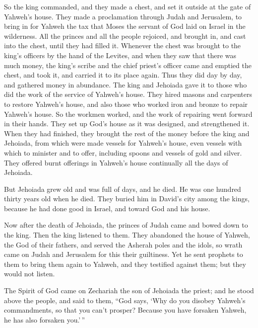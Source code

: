  So the king commanded, and they made a chest, and set it
outside at the gate of Yahweh's house.  They made a
proclamation through Judah and Jerusalem, to bring in for Yahweh the tax
that Moses the servant of God laid on Israel in the wilderness.
 All the princes and all the people rejoiced, and brought
in, and cast into the chest, until they had filled it. 
Whenever the chest was brought to the king's officers by the hand of the
Levites, and when they saw that there was much money, the king's scribe
and the chief priest's officer came and emptied the chest, and took it,
and carried it to its place again. Thus they did day by day, and
gathered money in abundance.  The king and Jehoiada gave
it to those who did the work of the service of Yahweh's house. They
hired masons and carpenters to restore Yahweh's house, and also those
who worked iron and bronze to repair Yahweh's house.  So
the workmen worked, and the work of repairing went forward in their
hands. They set up God's house as it was designed, and strengthened it.
 When they had finished, they brought the rest of the
money before the king and Jehoiada, from which were made vessels for
Yahweh's house, even vessels with which to minister and to offer,
including spoons and vessels of gold and silver. They offered burnt
offerings in Yahweh's house continually all the days of Jehoiada.

 But Jehoiada grew old and was full of days, and he died.
He was one hundred thirty years old when he died.  They
buried him in David's city among the kings, because he had done good in
Israel, and toward God and his house.

 Now after the death of Jehoiada, the princes of Judah
came and bowed down to the king. Then the king listened to them.
 They abandoned the house of Yahweh, the God of their
fathers, and served the Asherah poles and the idols, so wrath came on
Judah and Jerusalem for this their guiltiness.  Yet he
sent prophets to them to bring them again to Yahweh, and they testified
against them; but they would not listen.

 The Spirit of God came on Zechariah the son of Jehoiada
the priest; and he stood above the people, and said to them, ``God says,
`Why do you disobey Yahweh's commandments, so that you can't prosper?
Because you have forsaken Yahweh, he has also forsaken you.'\,''

